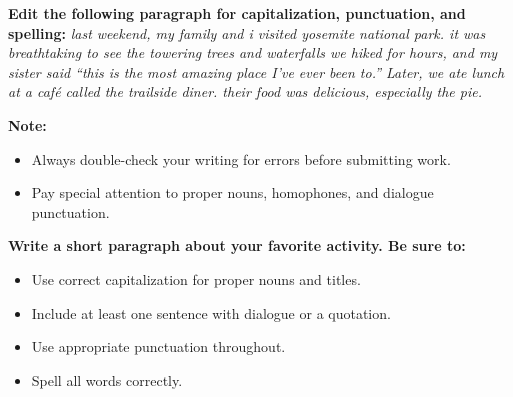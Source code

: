 \documentclass[12pt]{article}
\begin{document}
\vspace{1em}

\begin{tcolorbox}[colframe=black!60, colback=white, 
coltitle=black, colbacktitle=black!15, fonttitle=\bfseries\Large, 
title=Editing Exercises, halign title=center, left=10pt, right=10pt, top=10pt, bottom=15pt]
\textbf{Edit the following paragraph for capitalization, punctuation, and spelling:}
\vspace{1em}
\textit{last weekend, my family and i visited yosemite national park. it was breathtaking to see the towering trees and waterfalls we hiked for hours, and my sister said “this is the most amazing place I’ve ever been to.” Later, we ate lunch at a café called the trailside diner. their food was delicious, especially the pie.}
\end{tcolorbox}

\vspace{1em}

\begin{tcolorbox}[colframe=black!40, colback=gray!5, 
coltitle=black, colbacktitle=black!20, fonttitle=\bfseries\Large, 
title=Additional Notes, halign title=center, left=5pt, right=5pt, top=5pt, bottom=15pt]
\textbf{Note:}
\begin{itemize}
    \item Always double-check your writing for errors before submitting work.
    \item Pay special attention to proper nouns, homophones, and dialogue punctuation.
\end{itemize}
\end{tcolorbox}

\vspace{1em}

\begin{tcolorbox}[colframe=black!60, colback=white, 
coltitle=black, colbacktitle=black!15, fonttitle=\bfseries\Large, 
title=Exit Ticket, halign title=center, left=10pt, right=10pt, top=5pt, bottom=15pt]

\textbf{Write a short paragraph about your favorite activity. Be sure to:}
\begin{itemize}
    \item Use correct capitalization for proper nouns and titles.
    \item Include at least one sentence with dialogue or a quotation.
    \item Use appropriate punctuation throughout.
    \item Spell all words correctly.
\end{itemize}

\vspace{8em}

\end{tcolorbox}
\end{document}
